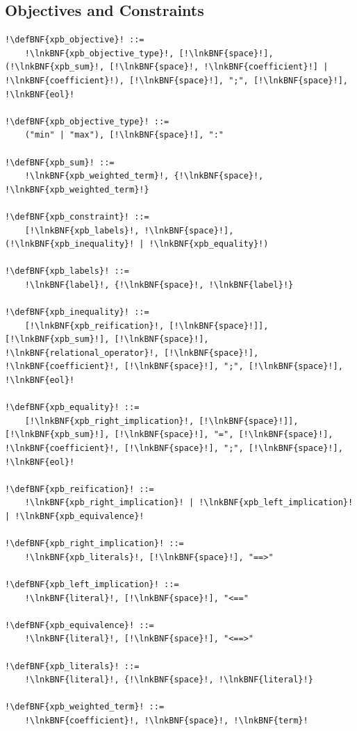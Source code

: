 \documentclass[a4paper]{article}
\newcommand{\defBNF}[1]{\hypertarget{def:#1}{<\detokenize{#1}>}}
\newcommand{\lnkBNF}[1]{\hyperlink{def:#1}{<\detokenize{#1}>}}
\begin{document}
\subsection{Objectives and Constraints}
\begin{lstlisting}
!\defBNF{xpb_objective}! ::=
	!\lnkBNF{xpb_objective_type}!, [!\lnkBNF{space}!], (!\lnkBNF{xpb_sum}!, [!\lnkBNF{space}!, !\lnkBNF{coefficient}!] | !\lnkBNF{coefficient}!), [!\lnkBNF{space}!], ";", [!\lnkBNF{space}!], !\lnkBNF{eol}!

!\defBNF{xpb_objective_type}! ::=
	("min" | "max"), [!\lnkBNF{space}!], ":"

!\defBNF{xpb_sum}! ::=
	!\lnkBNF{xpb_weighted_term}!, {!\lnkBNF{space}!, !\lnkBNF{xpb_weighted_term}!}

!\defBNF{xpb_constraint}! ::=
	[!\lnkBNF{xpb_labels}!, !\lnkBNF{space}!], (!\lnkBNF{xpb_inequality}! | !\lnkBNF{xpb_equality}!)

!\defBNF{xpb_labels}! ::=
	!\lnkBNF{label}!, {!\lnkBNF{space}!, !\lnkBNF{label}!}

!\defBNF{xpb_inequality}! ::=
	[!\lnkBNF{xpb_reification}!, [!\lnkBNF{space}!]], [!\lnkBNF{xpb_sum}!], [!\lnkBNF{space}!], !\lnkBNF{relational_operator}!, [!\lnkBNF{space}!], !\lnkBNF{coefficient}!, [!\lnkBNF{space}!], ";", [!\lnkBNF{space}!], !\lnkBNF{eol}!

!\defBNF{xpb_equality}! ::=
	[!\lnkBNF{xpb_right_implication}!, [!\lnkBNF{space}!]], [!\lnkBNF{xpb_sum}!], [!\lnkBNF{space}!], "=", [!\lnkBNF{space}!], !\lnkBNF{coefficient}!, [!\lnkBNF{space}!], ";", [!\lnkBNF{space}!], !\lnkBNF{eol}!

!\defBNF{xpb_reification}! ::=
	!\lnkBNF{xpb_right_implication}! | !\lnkBNF{xpb_left_implication}! | !\lnkBNF{xpb_equivalence}!

!\defBNF{xpb_right_implication}! ::=
	!\lnkBNF{xpb_literals}!, [!\lnkBNF{space}!], "==>"

!\defBNF{xpb_left_implication}! ::=
	!\lnkBNF{literal}!, [!\lnkBNF{space}!], "<=="

!\defBNF{xpb_equivalence}! ::=
	!\lnkBNF{literal}!, [!\lnkBNF{space}!], "<==>"

!\defBNF{xpb_literals}! ::=
	!\lnkBNF{literal}!, {!\lnkBNF{space}!, !\lnkBNF{literal}!}

!\defBNF{xpb_weighted_term}! ::=
	!\lnkBNF{coefficient}!, !\lnkBNF{space}!, !\lnkBNF{term}!
\end{lstlisting}
\end{document}

